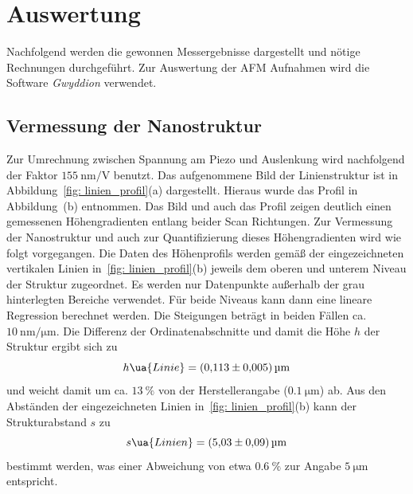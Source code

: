 \section{Auswertung}
Nachfolgend werden die gewonnen Messergebnisse dargestellt und nötige Rechnungen durchgeführt.
Zur Auswertung der AFM Aufnahmen wird die Software \textit{Gwyddion} verwendet.

\FloatBarrier
\subsection{Vermessung der Nanostruktur}

Zur Umrechnung zwischen Spannung am Piezo und Auslenkung wird nachfolgend der Faktor
$\SI{155}{\nano\meter \per \volt}$ benutzt.
Das aufgenommene Bild der Linienstruktur ist in Abbildung~\ref{fig: linien_profil}(a) dargestellt. Hieraus wurde
das Profil in Abbildung~(b) entnommen. Das Bild und auch das Profil zeigen deutlich einen gemessenen
Höhengradienten entlang beider Scan Richtungen. Zur Vermessung der Nanostruktur und auch zur Quantifizierung
dieses Höhengradienten wird wie folgt vorgegangen. Die Daten des Höhenprofils werden gemäß der
eingezeichneten vertikalen Linien in~\ref{fig: linien_profil}(b) jeweils dem oberen und unterem
Niveau der Struktur zugeordnet. Es werden nur Datenpunkte außerhalb der grau hinterlegten Bereiche verwendet.
Für beide Niveaus kann dann eine lineare Regression berechnet werden.
Die Steigungen beträgt in beiden Fällen ca. $\SI{10}{\nano\meter\per\micro\meter}$. Die Differenz
der Ordinatenabschnitte und damit die Höhe $h$ der Struktur ergibt sich zu
\begin{equation}
  h\ua{Linie} = \SI{0.113(5)}{\micro\meter}
\end{equation}
und weicht damit um ca. $\SI{13}{\percent}$ von der Herstellerangabe ($\SI{0.1}{\micro\meter}$) ab. Aus den Abständen der eingezeichneten
Linien in~\ref{fig: linien_profil}(b) kann der Strukturabstand $s$ zu
\begin{equation}
  s\ua{Linien} = \SI{5.03(9)}{\micro\meter}
\end{equation}
bestimmt werden, was einer Abweichung von etwa $\SI{0.6}{\percent}$ zur Angabe $\SI{5}{\micro\meter}$ entspricht.
